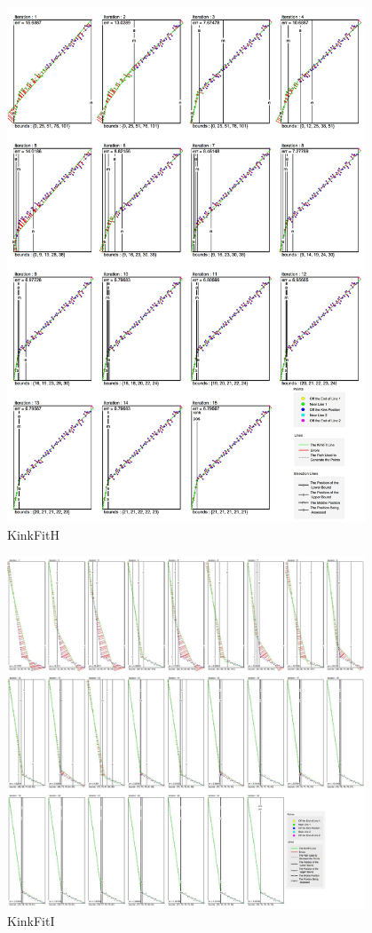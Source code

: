 \begin{figure}[h!]
  \centering
    \includegraphics[width=0.95\textwidth]{Chapter4/Figs/KinkFit_H.jpg}
    \caption{KinkFitH}\label{fig:KinkFitH}
\end{figure}

\begin{figure}[h!]
  \centering
    \includegraphics[width=0.95\textwidth]{Chapter4/Figs/KinkFit_I.jpg}
    \caption{KinkFitI}\label{fig:KinkFitI}
\end{figure}

